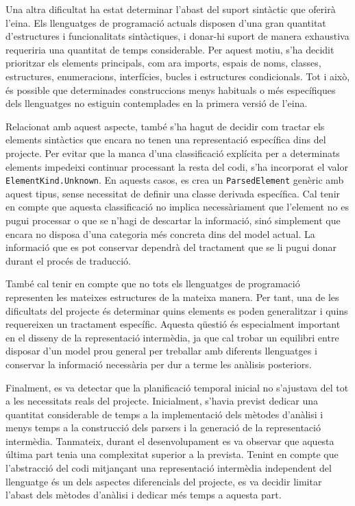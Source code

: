 Una altra dificultat ha estat determinar l'abast del suport sintàctic que oferirà l'eina. Els llenguatges de programació actuals disposen d'una gran quantitat d'estructures i funcionalitats sintàctiques, i donar-hi suport de manera exhaustiva requeriria una quantitat de temps considerable. Per aquest motiu, s'ha decidit prioritzar els elements principals, com ara imports, espais de noms, classes, estructures, enumeracions, interfícies, bucles i estructures condicionals. Tot i això, és possible que determinades construccions menys habituals o més específiques dels llenguatges no estiguin contemplades en la primera versió de l'eina.

Relacionat amb aquest aspecte, també s'ha hagut de decidir com tractar els elements sintàctics que encara no tenen una representació específica dins del projecte. Per evitar que la manca d'una classificació explícita per a determinats elements impedeixi continuar processant la resta del codi, s'ha incorporat el valor \texttt{ElementKind.Unknown}. En aquests casos, es crea un \texttt{ParsedElement} genèric amb aquest tipus, sense necessitat de definir una classe derivada específica. Cal tenir en compte que aquesta classificació no implica necessàriament que l'element no es pugui processar o que se n'hagi de descartar la informació, sinó simplement que encara no disposa d'una categoria més concreta dins del model actual. La informació que es pot conservar dependrà del tractament que se li pugui donar durant el procés de traducció.

També cal tenir en compte que no tots els llenguatges de programació representen les mateixes estructures de la mateixa manera. Per tant, una de les dificultats del projecte és determinar quins elements es poden generalitzar i quins requereixen un tractament específic. Aquesta qüestió és especialment important en el disseny de la representació intermèdia, ja que cal trobar un equilibri entre disposar d'un model prou general per treballar amb diferents llenguatges i conservar la informació necessària per dur a terme les anàlisis posteriors.

Finalment, es va detectar que la planificació temporal inicial no s'ajustava del tot a les necessitats reals del projecte. Inicialment, s'havia previst dedicar una quantitat considerable de temps a la implementació dels mètodes d'anàlisi i menys temps a la construcció dels parsers i la generació de la representació intermèdia. Tanmateix, durant el desenvolupament es va observar que aquesta última part tenia una complexitat superior a la prevista. Tenint en compte que l'abstracció del codi mitjançant una representació intermèdia independent del llenguatge és un dels aspectes diferencials del projecte, es va decidir limitar l'abast dels mètodes d'anàlisi i dedicar més temps a aquesta part.

